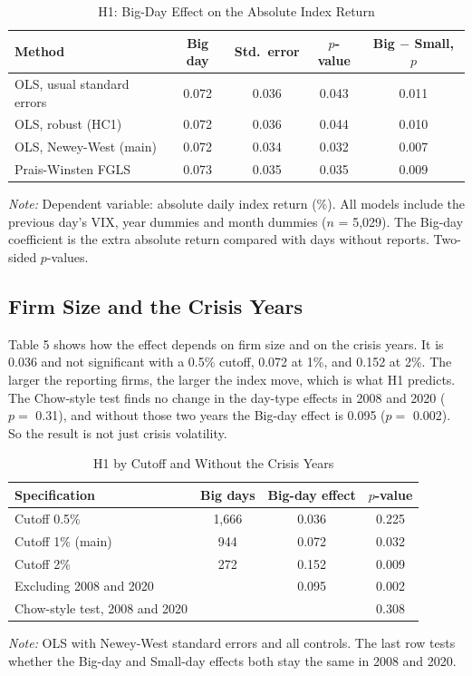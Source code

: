 \documentclass[preprint,letterpaper,11pt,authoryear]{elsarticle}
\newenvironment{tablenotes}{\par\vspace{3pt}\begin{minipage}{0.95\linewidth}\footnotesize\textit{Note:} }{\end{minipage}}
\begin{document}
\begin{table}[!htbp]
\centering\small\setlength{\tabcolsep}{4pt}
\caption{H1: Big-Day Effect on the Absolute Index Return}
\begin{tabular}{lcccc}
\toprule
Method & Big day & Std.\ error & $p$-value & Big $-$ Small, $p$ \\
\midrule
OLS, usual standard errors & 0.072 & 0.036 & 0.043 & 0.011 \\
OLS, robust (HC1) & 0.072 & 0.036 & 0.044 & 0.010 \\
OLS, Newey-West (main) & 0.072 & 0.034 & 0.032 & 0.007 \\
Prais-Winsten FGLS & 0.073 & 0.035 & 0.035 & 0.009 \\
\bottomrule
\end{tabular}
\begin{tablenotes}
Dependent variable: absolute daily index return (\%). All models include the previous day's VIX, year dummies and month dummies ($n$ = 5,029). The Big-day coefficient is the extra absolute return compared with days without reports. Two-sided $p$-values.
\end{tablenotes}
\end{table}

\subsection{Firm Size and the Crisis Years}
Table 5 shows how the effect depends on firm size and on the crisis years. It is 0.036 and not significant with a 0.5\% cutoff, 0.072 at 1\%, and 0.152 at 2\%. The larger the reporting firms, the larger the index move, which is what H1 predicts. The Chow-style test finds no change in the day-type effects in 2008 and 2020 ($p =$ 0.31), and without those two years the Big-day effect is 0.095 ($p =$ 0.002). So the result is not just crisis volatility.

\begin{table}[!htbp]
\centering\small\setlength{\tabcolsep}{4pt}
\caption{H1 by Cutoff and Without the Crisis Years}
\begin{tabular}{lccc}
\toprule
Specification & Big days & Big-day effect & $p$-value \\
\midrule
Cutoff 0.5\% & 1,666 & 0.036 & 0.225 \\
Cutoff 1\% (main) & 944 & 0.072 & 0.032 \\
Cutoff 2\% & 272 & 0.152 & 0.009 \\
Excluding 2008 and 2020 &  & 0.095 & 0.002 \\
Chow-style test, 2008 and 2020 &  &  & 0.308 \\
\bottomrule
\end{tabular}
\begin{tablenotes}
OLS with Newey-West standard errors and all controls. The last row tests whether the Big-day and Small-day effects both stay the same in 2008 and 2020.
\end{tablenotes}
\end{table}
\end{document}
